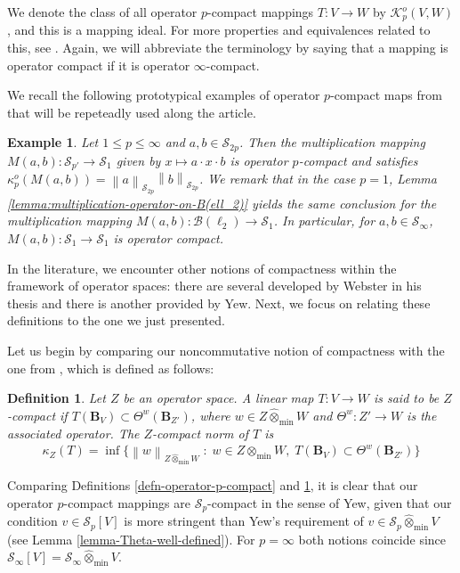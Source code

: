 \documentclass[11pt]{amsart}
\newcommand{\n}[1]{ \left\|#1\right\| }
\newtheorem{definition}[theorem]{Definition}
\newtheorem{example}[theorem]{Example}
\numberwithin{equation}{section}
\begin{document}
We denote the class of all operator $p$-compact mappings $T:V \to W$ by $\mathcal K_p^o(V,W)$,  and this is a mapping ideal.
For more properties and equivalences related to this, see \cite{ChaDiGa-Operator-p-compact}.
Again, we will abbreviate the terminology by saying that a mapping is operator compact if it is operator $\infty$-compact.

We recall the following prototypical examples of 
 operator $p$-compact maps from \cite[Prop. 2.7]{ChaDiGa-Operator-p-compact} that will be repeteadly used along the article.

\begin{example}\label{example-multiplication-is-operator-compact}
Let $1 \leq p \leq \infty$ and  $a,b \in \mathcal{S}_{2p}$. Then the multiplication mapping
$ M(a,b) : \mathcal{S}_{p'} \to \mathcal{S}_1$ given by $x \mapsto a \cdot x \cdot b$
is operator $p$-compact and satisfies $\kappa_p^o(M(a,b)) = \n{a}_{\mathcal{S}_{2p}} \n{b}_{\mathcal{S}_{2p}}$. 
We remark that in the case $p=1$, Lemma \ref{lemma:multiplication-operator-on-B(ell_2)} yields the same conclusion for the multiplication mapping $M(a,b) : \mathcal{B}(\ell_2) \to \mathcal{S}_1$.
In particular, for $a, b \in \mathcal{S}_\infty$, $M(a,b) : \mathcal{S}_1 \to \mathcal{S}_1$ is operator compact.
\end{example}

In the literature, we encounter other notions of compactness within the framework of operator spaces: there are several developed by Webster in his thesis and there is another provided by Yew. Next, we focus  on relating these definitions to the one we just presented.

Let us begin by comparing our noncommutative notion of compactness with the  one from \cite{Yew}, which is defined as follows:

\begin{definition}\label{defn-Yew-compact}
Let $Z$ be an operator space. A linear map $T:V \to W$ is said to be \emph{$Z$-compact} if $T(\mathbf{B}_V) \subset \Theta^w(\mathbf{B}_{Z'})$, where $w \in Z \widehat{\otimes}_{\min}W$ and $\Theta^w : Z' \to W$ is the associated operator.
The $Z$-compact norm of $T$ is
\[
\kappa_Z(T) = \inf\big\{ \n{w}_{Z \widehat{\otimes}_{\min}W} \;:\; w \in Z \widehat{\otimes}_{\min}W, \; T(\mathbf{B}_V) \subset \Theta^w(\mathbf{B}_{Z'}) \big\}
\]
\end{definition}

Comparing Definitions \ref{defn-operator-p-compact} and \ref{defn-Yew-compact},
it is clear that our operator $p$-compact mappings are $\mathcal{S}_p$-compact in the sense of Yew, given that our condition $v\in \mathcal{S}_p[V]$ is more stringent than Yew's requirement of $v \in \mathcal{S}_p \widehat{\otimes}_{\min} V$ (see Lemma \ref{lemma-Theta-well-defined}). For $p=\infty$ both notions coincide since $\mathcal{S}_\infty[V]=\mathcal{S}_\infty\widehat\otimes_{\min} V$.
\end{document}
